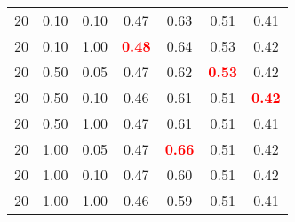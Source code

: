 \begin{tabular}{lllcccc}
20 & 0.10 & 0.10 & 0.47 & 0.63 & 0.51 & 0.41 \\ 
20 & 0.10 & 1.00 & \textbf{\textcolor{red}{0.48}} & 0.64 & 0.53 & 0.42 \\ 
20 & 0.50 & 0.05 & 0.47 & 0.62 & \textbf{\textcolor{red}{0.53}} & 0.42 \\ 
20 & 0.50 & 0.10 & 0.46 & 0.61 & 0.51 & \textbf{\textcolor{red}{0.42}} \\ 
20 & 0.50 & 1.00 & 0.47 & 0.61 & 0.51 & 0.41 \\ 
20 & 1.00 & 0.05 & 0.47 & \textbf{\textcolor{red}{0.66}} & 0.51 & 0.42 \\ 
20 & 1.00 & 0.10 & 0.47 & 0.60 & 0.51 & 0.42 \\ 
20 & 1.00 & 1.00 & 0.46 & 0.59 & 0.51 & 0.41 \\ 
\end{tabular} 
